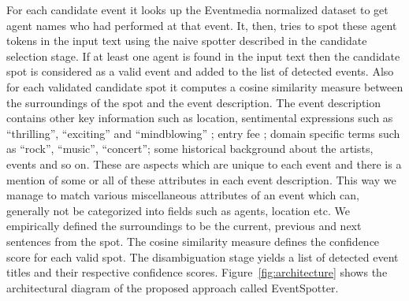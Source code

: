 \documentclass[10pt,a4paper]{article}
\begin{document}
For each candidate event it looks up the Eventmedia normalized dataset to get agent names who had performed at that event. It, then, tries to spot these  agent tokens in the input text using the naive spotter described in the candidate selection stage. If at least one agent is found in the input text then the candidate spot is considered as a valid event and added to the list of detected events. Also for each validated candidate spot it computes a cosine similarity measure between the surroundings of the spot and the event description. The event description contains other key information such as location, sentimental expressions such as ``thrilling'', ``exciting'' and ``mindblowing'' ; entry fee ; domain specific terms such as ``rock'', ``music'', ``concert''; some historical background about the artists, events and so on. These are aspects which are unique to each event and there is a mention of some or all of these attributes in each event description. This way we manage to match various miscellaneous attributes of an event which can, generally not be categorized into fields such as agents, location etc. We empirically defined the surroundings to be the current, previous and next sentences from the spot. The cosine similarity measure defines the confidence score for each valid spot. The disambiguation stage yields a list of detected event titles and their respective confidence scores.
Figure~\ref{fig:architecture} shows the architectural diagram of the proposed approach called EventSpotter. 
\end{document}
